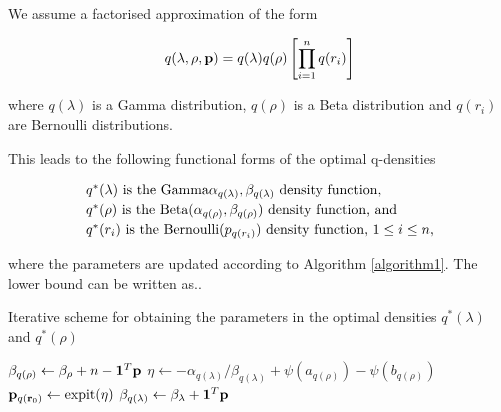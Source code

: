 \documentclass{article}[12pt]
\begin{document}
\noindent We assume a factorised approximation of the form

$$
q(\lambda, \rho, {\bf p}) = q(\lambda) q(\rho) \left [ \prod_{i=1}^n q(r_i) \right ]
$$

\noindent where $q(\lambda)$ is a Gamma distribution, $q(\rho)$ is a Beta distribution and
$q(r_i)$ are Bernoulli distributions.

\noindent This leads to the following functional forms of the optimal q-densities

$$
\begin{array}{l}
\mbox{$q^*(\lambda)$ is the $\text{Gamma} \alpha_{q(\lambda)}, \beta_{q(\lambda)}$ density function,} \\ [0.5ex]
\mbox{$q^*(\rho)$ is the $\text{Beta}(\alpha_{q(\rho)}, \beta_{q(\rho)})$ density function, and} \\ [0.5ex]
\mbox{$q^*(r_i)$  is the $\text{Bernoulli}(p_{q(r_i)})$ density function, $1 \leq i \leq n$,}
\end{array}
$$


\noindent where the parameters are updated according to Algorithm \ref{algorithm1}. The lower bound can be written as..



\begin{algorithm} 
\caption[Algorithm 1]{Iterative scheme for obtaining the parameters in the
optimal densities $q^*(\lambda)$ and $q^*(\rho)$}
\begin{algorithmic}
\STATE $\beta_{q(\rho)} \leftarrow \beta_\rho + n - {\bf 1}^T{\bf p}$
\STATE $\eta \leftarrow -\alpha_{q(\lambda)}/\beta_{q(\lambda)} + \psi{(a_{q{(\rho)}})} - \psi{(b_{q{(\rho)}})}$
\STATE ${\bf p}_{q({\bf r}_0)} \leftarrow \text{expit} (\eta)$
\STATE $\beta_{q(\lambda)} \leftarrow \beta_\lambda + {\bf 1}^T{\bf p}$
\ENDWHILE
\end{algorithmic}
\label{algorithm1}
\end{algorithm}

\end{document}
